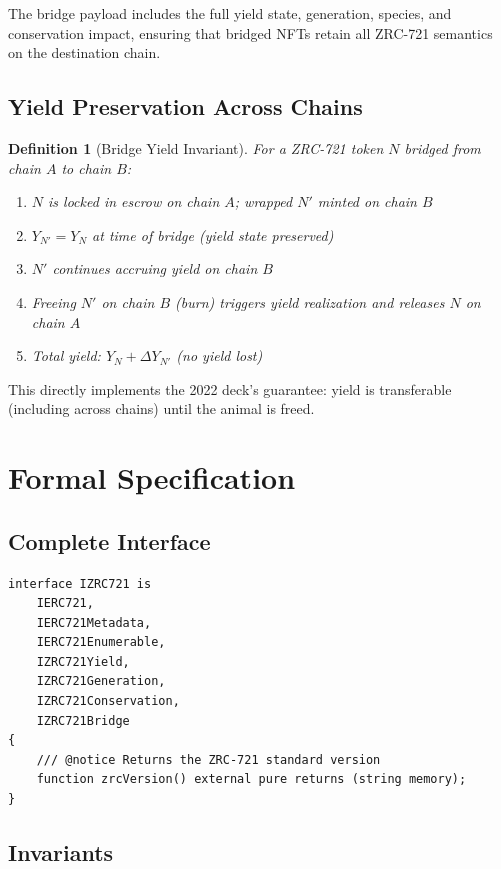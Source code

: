 \documentclass[11pt,letterpaper]{article}
\newtheorem{definition}{Definition}[section]
\begin{document}
The bridge payload includes the full yield state, generation, species, and conservation impact, ensuring that bridged NFTs retain all ZRC-721 semantics on the destination chain.

\subsection{Yield Preservation Across Chains}

\begin{definition}[Bridge Yield Invariant]
For a ZRC-721 token $N$ bridged from chain $A$ to chain $B$:
\begin{enumerate}
    \item $N$ is locked in escrow on chain $A$; wrapped $N'$ minted on chain $B$
    \item $Y_{N'} = Y_N$ at time of bridge (yield state preserved)
    \item $N'$ continues accruing yield on chain $B$
    \item Freeing $N'$ on chain $B$ (burn) triggers yield realization and releases $N$ on chain $A$
    \item Total yield: $Y_N + \Delta Y_{N'}$ (no yield lost)
\end{enumerate}
\end{definition}

This directly implements the 2022 deck's guarantee: yield is transferable (including across chains) until the animal is freed.

\section{Formal Specification}
\label{sec:spec}

\subsection{Complete Interface}

\begin{lstlisting}[language=Solidity,caption=ZRC-721 Complete Interface]
interface IZRC721 is
    IERC721,
    IERC721Metadata,
    IERC721Enumerable,
    IZRC721Yield,
    IZRC721Generation,
    IZRC721Conservation,
    IZRC721Bridge
{
    /// @notice Returns the ZRC-721 standard version
    function zrcVersion() external pure returns (string memory);
}
\end{lstlisting}

\subsection{Invariants}
\end{document}
